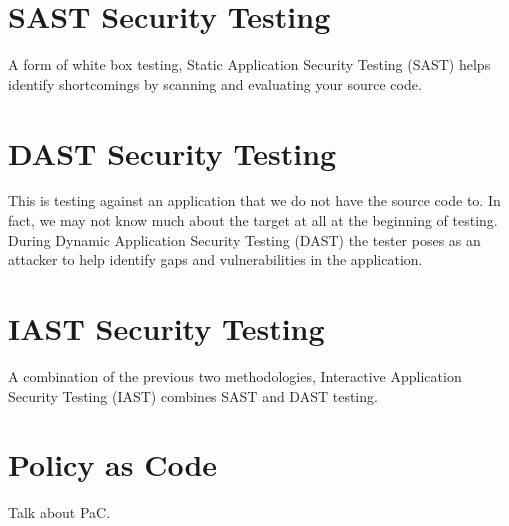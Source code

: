 \section{SAST Security Testing}

\justifying
A form of white box testing, Static Application Security Testing (SAST) helps identify
shortcomings by scanning and evaluating your source code.

\section{DAST Security Testing}

\justifying
This is testing against an application that we do not have the source code to. In fact, we may not know much
about the target at all at the beginning of testing. During Dynamic Application Security Testing (DAST)
the tester poses as an attacker to help identify gaps and vulnerabilities in the application.

\section{IAST Security Testing}

\justifying
A combination of the previous two methodologies, Interactive Application Security Testing (IAST) combines
SAST and DAST testing.

\section{Policy as Code}

\justifying
Talk about PaC.
